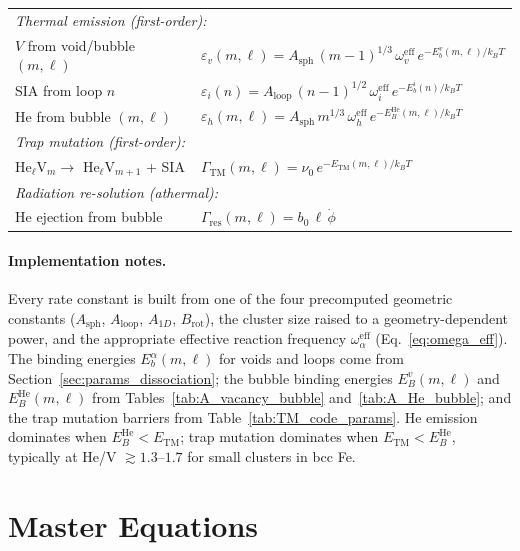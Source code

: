 \documentclass[pdflatex,sn-basic]{sn-jnl} %
\begin{document}
\begin{table}[htbp]
\begin{tabular}{@{}p{3.8cm}l@{}}
\multicolumn{2}{l}{\emph{Thermal emission (first-order):}} \\
$V$ from void/bubble $(m,\ell)$
  & $\varepsilon_v(m,\ell) = A_{\mathrm{sph}}\,(m{-}1)^{1/3}\,\omega_v^{\mathrm{eff}}\,
    e^{-E_b^v(m,\ell)/k_BT}$ \\
SIA from loop $n$
  & $\varepsilon_i(n) = A_{\mathrm{loop}}\,(n{-}1)^{1/2}\,\omega_i^{\mathrm{eff}}\,
    e^{-E_b^i(n)/k_BT}$ \\
He from bubble $(m,\ell)$
  & $\varepsilon_h(m,\ell) = A_{\mathrm{sph}}\,m^{1/3}\,\omega_h^{\mathrm{eff}}\,
    e^{-E_B^{\mathrm{He}}(m,\ell)/k_BT}$ \\[3pt]

\multicolumn{2}{l}{\emph{Trap mutation (first-order):}} \\
He$_\ell$V$_m \to$ He$_\ell$V$_{m+1}$ + SIA
  & $\Gamma_{\mathrm{TM}}(m,\ell) = \nu_0\,e^{-E_{\mathrm{TM}}(m,\ell)/k_BT}$ \\[3pt]

\multicolumn{2}{l}{\emph{Radiation re-solution (athermal):}} \\
He ejection from bubble
  & $\Gamma_{\mathrm{res}}(m,\ell) = b_0\,\ell\,\dot{\phi}$ \\
\bottomrule
\end{tabular}
\end{table}

\paragraph{Implementation notes.}
Every rate constant is built from one of the four precomputed geometric
constants ($A_{\mathrm{sph}}$, $A_{\mathrm{loop}}$, $A_{1D}$,
$B_{\mathrm{rot}}$), the cluster size raised to a geometry-dependent power,
and the appropriate effective reaction frequency $\omega_\alpha^{\mathrm{eff}}$
(Eq.~\ref{eq:omega_eff}). The binding energies $E_b^\alpha(m,\ell)$ for voids
and loops come from Section~\ref{sec:params_dissociation}; the bubble binding
energies $E_B^v(m,\ell)$ and $E_B^{\mathrm{He}}(m,\ell)$ from
Tables~\ref{tab:A_vacancy_bubble} and~\ref{tab:A_He_bubble}; and the trap
mutation barriers from Table~\ref{tab:TM_code_params}. He emission dominates
when $E_B^{\mathrm{He}} < E_{\mathrm{TM}}$; trap mutation dominates when
$E_{\mathrm{TM}} < E_B^{\mathrm{He}}$, typically at He/V $\gtrsim 1.3$--$1.7$
for small clusters in bcc Fe.

\clearpage
\section{Master Equations}
\label{sec:rate_equations}
\end{document}
